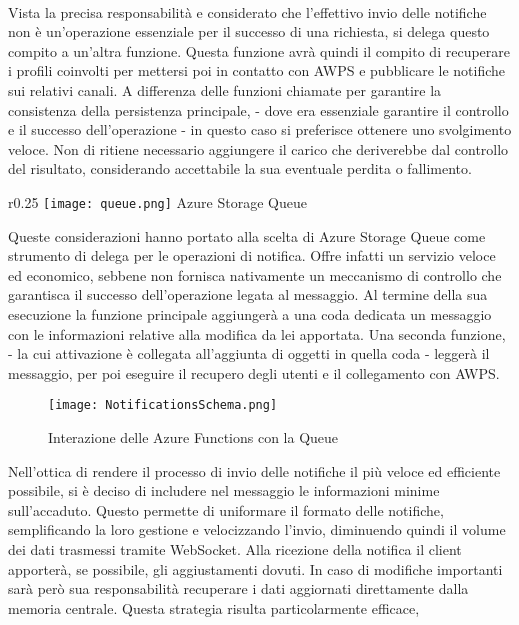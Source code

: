 \\
Vista la precisa responsabilità e considerato che 
l'effettivo invio delle notifiche 
non è un'operazione essenziale per il successo di una richiesta,
si delega questo compito a un'altra funzione.
Questa funzione avrà quindi il compito di recuperare i profili coinvolti
per mettersi poi in contatto con AWPS e
pubblicare le notifiche sui relativi canali.
A differenza delle funzioni chiamate per garantire la consistenza della persistenza principale,
- dove era essenziale garantire il controllo e il successo dell'operazione -
in questo caso si preferisce ottenere uno svolgimento veloce.
Non di ritiene necessario aggiungere il carico
che deriverebbe dal controllo del risultato,
considerando accettabile la sua eventuale perdita o fallimento.\\
\begin{wrapfigure}{r}{0.25\textwidth}
    \centering
    \texttt{[image: queue.png]}
    Azure Storage Queue
\end{wrapfigure}
Queste considerazioni hanno portato alla scelta di Azure Storage Queue
come strumento di delega per le operazioni di notifica.
Offre infatti un servizio veloce ed economico, 
sebbene non fornisca nativamente un meccanismo di controllo 
che garantisca il successo dell'operazione legata al messaggio.
Al termine della sua esecuzione la funzione principale aggiungerà
a una coda dedicata un messaggio con le informazioni relative 
alla modifica da lei apportata.
Una seconda funzione,
- la cui attivazione è collegata all'aggiunta di oggetti in quella coda -
leggerà il messaggio, per poi eseguire il recupero degli utenti e il collegamento con AWPS.\\
\begin{figure}[htpb]
    \centering
    \texttt{[image: NotificationsSchema.png]}
    \caption{Interazione delle Azure Functions con la Queue}
\end{figure}
\clearpage
Nell'ottica di rendere il processo di invio delle notifiche
il più veloce ed efficiente possibile, 
si è deciso di includere nel messaggio le informazioni minime sull'accaduto.
Questo permette di uniformare il formato delle notifiche, 
semplificando la loro gestione e velocizzando l'invio,
diminuendo quindi il volume dei dati trasmessi tramite WebSocket.
Alla ricezione della notifica il client apporterà,
se possibile, gli aggiustamenti dovuti.
In caso di modifiche importanti sarà però sua responsabilità 
recuperare i dati aggiornati direttamente dalla memoria centrale.
Questa strategia risulta particolarmente efficace,
